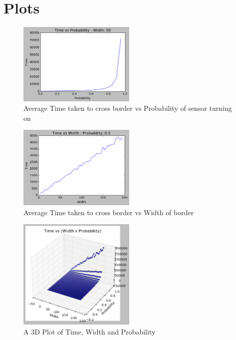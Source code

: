 \documentclass[12pt,a4paper]{article}
\begin{document}
\section{Plots}\label{sec:Plot}
\begin{figure}[!htbp]
    \centering
    \includegraphics[width=0.5\textwidth]{TvP.png}
    \caption{Average Time taken to cross border vs Probability of sensor turning on}
    \label{fig:example}
\end{figure}
\begin{figure}[!hbpt]
    \centering
    \includegraphics[width=0.5\textwidth]{TvW.png}
    \caption{Average Time taken to cross border vs Width of border}
    \label{fig:example}
\end{figure}
\pagebreak
\begin{figure}[!htbp]
    \centering
    \includegraphics[width=0.5\textwidth]{TvWxP.png}
    \caption{A 3D Plot of Time, Width and Probability}
    \label{fig:example}
\end{figure}
\end{document}
